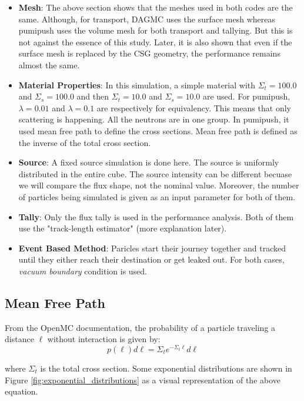 \documentclass{article}
\begin{document}
\begin{itemize}
	\item \textbf{Mesh}: The above section shows that the meshes used in both codes are the same. Although, for transport, DAGMC uses
	      the surface mesh whereas pumipush uses the volume mesh for both transport and tallying. But this is not against the essence of this study.
	      Later, it is also shown that even if the surface mesh is replaced by the CSG geometry, the performance remains almost the same.
	\item \textbf{Material Properties}: In this simulation, a simple material with $\Sigma_t = 100.0$ and $\Sigma_s = 100.0$ and then
	      $\Sigma_t = 10.0$ and $\Sigma_s = 10.0$ are used. For pumipush, $\lambda = 0.01$ and $\lambda = 0.1$ are respectively for equivalency.
	      This means that only scattering is happening. All the neutrons are in one group. In pumipush, it used mean free path to define
	      the cross sections. Mean free path is defined as the inverse of the total cross section.
	\item \textbf{Source}: A fixed source simulation is done here. The source is uniformly distributed in the entire cube.
	      The source intensity can be different becuase we will compare the flux shape, not the nominal value. Moreover, the number of
	      particles being simulated is given as an input parameter for both of them.
	\item \textbf{Tally}: Only the flux tally is used in the performance analysis. Both of them use the "track-length estimator" (more
	      explanation later).
	\item \textbf{Event Based Method}: Paricles start their journey together and tracked until they either reach their destination or
	      get leaked out. For both cases, \textit{vacuum boundary} condition is used.
\end{itemize}

\subsection{Mean Free Path}
From the OpenMC documentation, the probability of a particle traveling a distance $\ell$ without interaction is given by:
\begin{equation}
	p(\ell) d \ell=\Sigma_t e^{-\Sigma_t \ell} d \ell
\end{equation}

where $\Sigma_t$ is the total cross section. Some exponential distributions are shown in Figure \ref{fig:exponential_distributions} as
a visual representation of the above equation.
\end{document}
